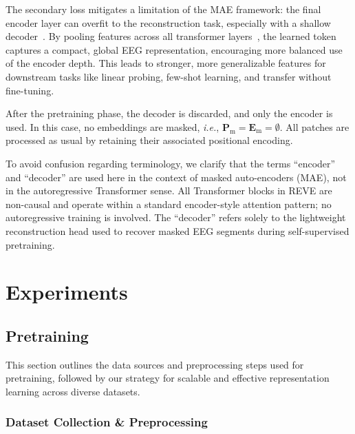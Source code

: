 \documentclass{article}
\begin{document}
The secondary loss mitigates a limitation of the MAE framework: the final encoder layer can overfit to the reconstruction task, especially with a shallow decoder~\citep{he2022masked}. By pooling features across all transformer layers~\citep{alkin2024mim}, the learned token captures a compact, global EEG representation, encouraging more balanced use of the encoder depth. This leads to stronger, more generalizable features for downstream tasks like linear probing, few-shot learning, and transfer without fine-tuning.

After the pretraining phase, the decoder is discarded, and only the encoder is used. In this case, no embeddings are masked, \emph{i.e.}, \( \mathbf{P}_{\text{m}} = \mathbf{E}_{\text{m}} =  \emptyset \). All patches are processed as usual by retaining their associated positional encoding.

To avoid confusion regarding terminology, we clarify that the terms “encoder” and “decoder” are used here in the context of masked auto-encoders (MAE), not in the autoregressive Transformer sense. All Transformer blocks in REVE are non-causal and operate within a standard encoder-style attention pattern; no autoregressive training is involved. The “decoder” refers solely to the lightweight reconstruction head used to recover masked EEG segments during self-supervised pretraining.
\section{Experiments}
\label{sec:exp_results}

\subsection{Pretraining}

This section outlines the data sources and preprocessing steps used for pretraining, followed by our strategy for scalable and effective representation learning across diverse datasets.

\subsubsection{Dataset Collection \& Preprocessing}

\end{document}
